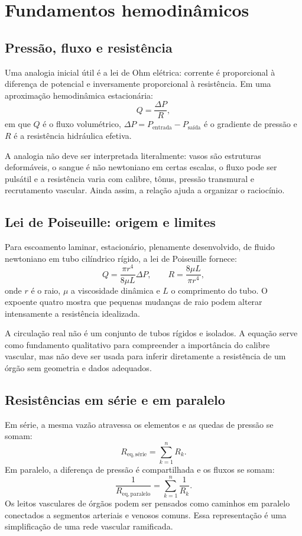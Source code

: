 \documentclass[11pt,a4paper,oneside]{book}
\begin{document}
\chapter{Fundamentos hemodinâmicos}

\section{Pressão, fluxo e resistência}
Uma analogia inicial útil é a lei de Ohm elétrica: corrente é proporcional à diferença de potencial e inversamente proporcional à resistência. Em uma aproximação hemodinâmica estacionária:
\begin{equation}
  Q = \frac{\Delta P}{R},
  \label{eq:ohm}
\end{equation}
em que $Q$ é o fluxo volumétrico, $\Delta P=P_{\mathrm{entrada}}-P_{\mathrm{saída}}$ é o gradiente de pressão e $R$ é a resistência hidráulica efetiva.

A analogia não deve ser interpretada literalmente: vasos são estruturas deformáveis, o sangue é não newtoniano em certas escalas, o fluxo pode ser pulsátil e a resistência varia com calibre, tônus, pressão transmural e recrutamento vascular. Ainda assim, a relação ajuda a organizar o raciocínio.

\section{Lei de Poiseuille: origem e limites}
Para escoamento laminar, estacionário, plenamente desenvolvido, de fluido newtoniano em tubo cilíndrico rígido, a lei de Poiseuille fornece:
\begin{equation}
  Q=\frac{\pi r^4}{8\mu L}\Delta P,
  \qquad
  R=\frac{8\mu L}{\pi r^4},
  \label{eq:poiseuille}
\end{equation}
onde $r$ é o raio, $\mu$ a viscosidade dinâmica e $L$ o comprimento do tubo. O expoente quatro mostra que pequenas mudanças de raio podem alterar intensamente a resistência idealizada.

A circulação real não é um conjunto de tubos rígidos e isolados. A equação serve como fundamento qualitativo para compreender a importância do calibre vascular, mas não deve ser usada para inferir diretamente a resistência de um órgão sem geometria e dados adequados.

\section{Resistências em série e em paralelo}
Em série, a mesma vazão atravessa os elementos e as quedas de pressão se somam:
\begin{equation}
  R_{\mathrm{eq,série}}=\sum_{k=1}^{n}R_k.
\end{equation}
Em paralelo, a diferença de pressão é compartilhada e os fluxos se somam:
\begin{equation}
  \frac{1}{R_{\mathrm{eq,paralelo}}}=\sum_{k=1}^{n}\frac{1}{R_k}.
\end{equation}
Os leitos vasculares de órgãos podem ser pensados como caminhos em paralelo conectados a segmentos arteriais e venosos comuns. Essa representação é uma simplificação de uma rede vascular ramificada.
\end{document}
